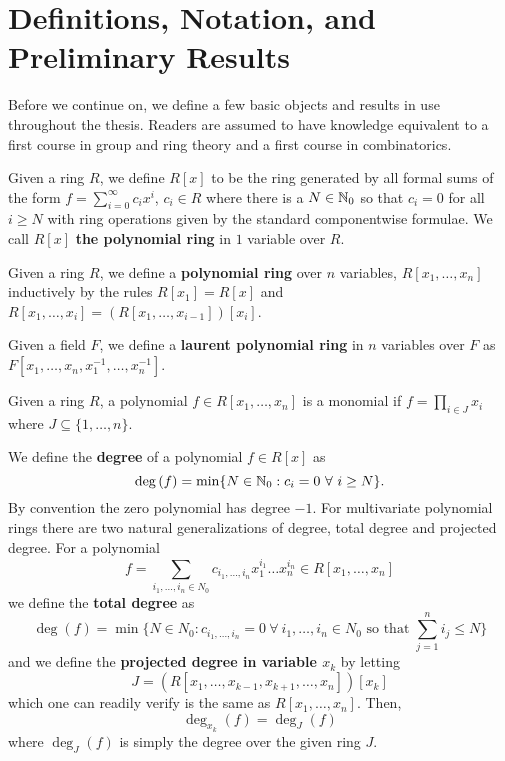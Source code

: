 \section{Definitions, Notation, and Preliminary Results}
Before we continue on, we define a few basic objects and results in use throughout the thesis. Readers are assumed to have knowledge equivalent to a first course in group and ring theory and a first course in combinatorics.
\begin{definition}
	Given a ring \(R\), we define \(R\left[ x \right] \) to be the ring generated by all formal sums of the form \(f = \sum_{i=0}^{\infty} c_{i} x^{i}\), \( c_{i} \in R\) where there is a \(N \in \mathbb{N}_{0}\) so that \(c_{i} = 0\) for all \(i \ge N\) with ring operations given by the standard componentwise formulae. We call \(R\left[ x \right] \) \textbf{the polynomial ring} in \(1\) variable over \(R\).
\end{definition}
\begin{definition}
Given a ring \(R\), we define a \textbf{polynomial ring} over \(n\) variables, \(R\left[ x_1, \ldots, x_{n} \right] \) inductively by the rules \( R\left[ x_1 \right] = R\left[ x \right] \) and \(R\left[ x_1, \ldots, x_{i} \right] = \left( R\left[ x_1, \ldots, x_{i-1} \right]  \right) \left[ x_{i} \right]   \).
\end{definition}
\begin{definition}
	Given a field \(F\), we define a \textbf{laurent polynomial ring} in \(n\) variables over \(F\) as \(F\left[ x_1, \ldots, x_{n}, x_1^{-1}, \ldots, x_{n}^{-1} \right] \).
\end{definition}
\begin{definition}[Monomial]
Given a ring \(R\), a polynomial \(f \in R\left[ x_1, \ldots, x_{n} \right] \)	is a monomial if \(f = \prod_{i \in J }^{} x_{i}\) where \(J \subseteq \{1, \ldots, n\} \).
\end{definition}
\begin{definition}[Degree]
	We define the \textbf{degree} of a polynomial \(f \in R\left[ x \right] \) as \[\deg \left( f \right) = \min \{N \in \mathbb{N}_{0}: c_{i} = 0 \ \forall \ i \ge N\} .\] By convention the zero polynomial has degree \(-1\).
	For multivariate polynomial rings there are two natural generalizations of degree, total degree and projected degree. For a polynomial \[f  = \sum_{i_1, \ldots, i_{n} \in N_0}^{} c_{i_1, \ldots, i_{n}} x_1^{i_1} \ldots x_{n}^{i_{n}} \in R\left[ x_1, \ldots, x_{n} \right] \] we define the \textbf{total degree} as \[\deg  \left(  f \right)  = \min \{N \in N_0 : c_{i_1, \ldots, i_n} = 0 \ \forall \ i_1, \ldots, i_{n} \in N_{0} \text{ so that } \sum_{j=1}^{n} i_{j} \le N  \} \] and we define the \textbf{projected degree in variable \(x_{k}\)} by letting \[J = \left( R\left[ x_1, \ldots, x_{k-1}, x_{k+1}, \ldots, x_{n} \right]  \right) \left[ x_{k} \right] \] which one can readily verify is the same as \(R\left[ x_1, \ldots, x_{n} \right] \). Then, \[
	\deg _{x_{k}} \left( f \right) = \deg_{J} \left(  f \right)
\] where \(\deg _{J}\left( f  \right) \) is simply the degree over the given ring \(J\).
\end{definition}
